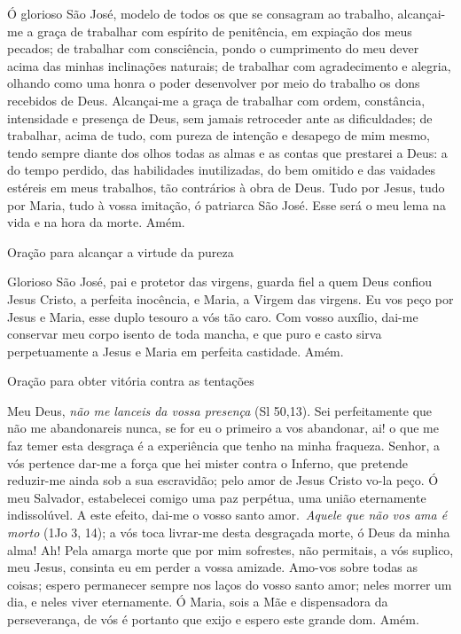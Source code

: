 \begin{flushleft}
    Ó glorioso São José, modelo de todos os que se consagram ao trabalho, alcançai-me a graça de trabalhar com espírito de penitência, em expiação dos meus pecados; de trabalhar com consciência, pondo o cumprimento do meu dever acima das minhas inclinações naturais; de trabalhar com agradecimento e alegria, olhando como uma honra o poder desenvolver por meio do trabalho os dons recebidos de Deus. Alcançai-me a graça de trabalhar com ordem, constância, intensidade e presença de Deus, sem jamais retroceder ante as dificuldades; de trabalhar, acima de tudo, com pureza de intenção e desapego de mim mesmo, tendo sempre diante dos olhos todas as almas e as contas que prestarei a Deus: a do tempo perdido, das habilidades inutilizadas, do bem omitido e das vaidades estéreis em meus trabalhos, tão contrários à obra de Deus. Tudo por Jesus, tudo por Maria, tudo à vossa imitação, ó patriarca São José. Esse será o meu lema na vida e na hora da morte. Amém.
\end{flushleft}
\begin{center}
    Oração para alcançar a virtude da pureza
\end{center}
\begin{flushleft}
    Glorioso São José, pai e protetor das virgens, guarda fiel a quem Deus confiou Jesus Cristo, a perfeita inocência, e Maria, a Virgem das virgens. Eu vos peço por Jesus e Maria, esse duplo tesouro a vós tão caro. Com vosso auxílio, dai-me conservar meu corpo isento de toda mancha, e que puro e casto sirva perpetuamente a Jesus e Maria em perfeita castidade. Amém.
\end{flushleft}
\begin{center}
    Oração para obter vitória contra as tentações
\end{center}
\begin{flushleft}
    Meu Deus, \textit{não me lanceis da vossa presença} (\textcolor{VioletRed3}{Sl 50,13}). Sei perfeitamente que não me abandonareis nunca, se for eu o primeiro a vos abandonar, ai! o que me faz temer esta desgraça é a experiência que tenho na minha fraqueza. Senhor, a vós pertence dar-me a força que hei mister contra o Inferno, que pretende reduzir-me ainda sob a sua escravidão; pelo amor de Jesus Cristo vo-la peço. Ó meu Salvador, estabelecei comigo uma paz perpétua, uma união eternamente indissolúvel. A este efeito, dai-me o vosso santo amor.\ \textit{Aquele que não vos ama é morto} (\textcolor{VioletRed3}{1Jo 3, 14}); a vós toca livrar-me desta desgraçada morte, ó Deus da minha alma! Ah! Pela amarga morte que por mim sofrestes, não permitais, a vós suplico, meu Jesus, consinta eu em perder a vossa amizade. Amo-vos sobre todas as coisas; espero permanecer sempre nos laços do vosso santo amor; neles morrer um dia, e neles viver eternamente. Ó Maria, sois a Mãe e dispensadora da perseverança, de vós é portanto que exijo e espero este grande dom. Amém.
\end{flushleft}
